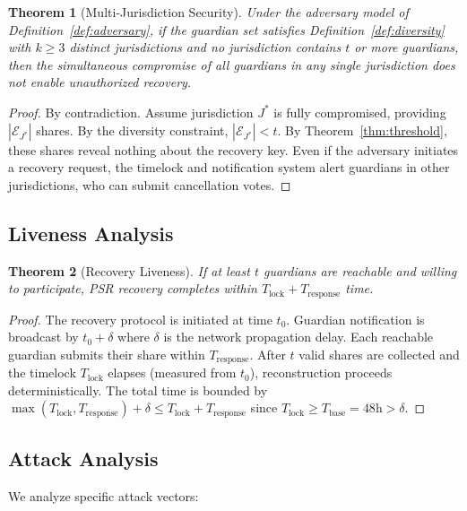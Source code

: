 \documentclass[11pt,a4paper,twocolumn]{article}
\newtheorem{theorem}{Theorem}[section]
\begin{document}
\begin{theorem}[Multi-Jurisdiction Security]\label{thm:multijur}
Under the adversary model of Definition~\ref{def:adversary}, if the guardian set satisfies Definition~\ref{def:diversity} with $k \geq 3$ distinct jurisdictions and no jurisdiction contains $t$ or more guardians, then the simultaneous compromise of all guardians in any single jurisdiction does not enable unauthorized recovery.
\end{theorem}

\begin{proof}
By contradiction. Assume jurisdiction $J^*$ is fully compromised, providing $|\mathcal{E}_{J^*}|$ shares. By the diversity constraint, $|\mathcal{E}_{J^*}| < t$. By Theorem~\ref{thm:threshold}, these shares reveal nothing about the recovery key. Even if the adversary initiates a recovery request, the timelock and notification system alert guardians in other jurisdictions, who can submit cancellation votes.
\end{proof}

\subsection{Liveness Analysis}

\begin{theorem}[Recovery Liveness]\label{thm:liveness}
If at least $t$ guardians are reachable and willing to participate, PSR recovery completes within $T_{\text{lock}} + T_{\text{response}}$ time.
\end{theorem}

\begin{proof}
The recovery protocol is initiated at time $t_0$. Guardian notification is broadcast by $t_0 + \delta$ where $\delta$ is the network propagation delay. Each reachable guardian submits their share within $T_{\text{response}}$. After $t$ valid shares are collected and the timelock $T_{\text{lock}}$ elapses (measured from $t_0$), reconstruction proceeds deterministically. The total time is bounded by $\max(T_{\text{lock}}, T_{\text{response}}) + \delta \leq T_{\text{lock}} + T_{\text{response}}$ since $T_{\text{lock}} \geq T_{\text{base}} = 48\text{h} > \delta$.
\end{proof}

\subsection{Attack Analysis}

We analyze specific attack vectors:
\end{document}
